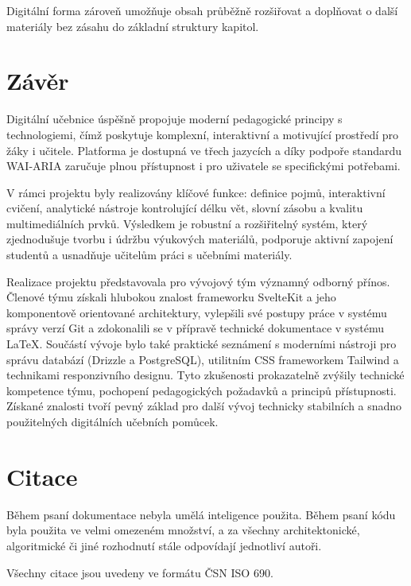 \documentclass[12pt]{article}
\begin{document}
    Digitální forma zároveň umožňuje obsah průběžně rozšiřovat a doplňovat o další materiály bez zásahu do základní struktury kapitol.

	\newpage
	\section{Závěr}
	
	Digitální učebnice úspěšně propojuje moderní pedagogické principy s technologiemi, čímž poskytuje komplexní, interaktivní a motivující prostředí pro žáky i učitele. Platforma je dostupná ve třech jazycích a díky podpoře standardu WAI-ARIA zaručuje plnou přístupnost i pro uživatele se specifickými potřebami.
	
	V rámci projektu byly realizovány klíčové funkce: definice pojmů, interaktivní cvičení, analytické nástroje kontrolující délku vět, slovní zásobu a kvalitu multimediálních prvků. Výsledkem je robustní a rozšiřitelný systém, který zjednodušuje tvorbu i údržbu výukových materiálů, podporuje aktivní zapojení studentů a usnadňuje učitelům práci s učebními materiály.
	
	Realizace projektu představovala pro vývojový tým významný odborný přínos. Členové týmu získali hlubokou znalost frameworku SvelteKit a jeho komponentově orientované architektury, vylepšili své postupy práce v systému správy verzí Git a zdokonalili se v přípravě technické dokumentace v systému \LaTeX. Součástí vývoje bylo také praktické seznámení s moderními nástroji pro správu databází (Drizzle a PostgreSQL), utilitním CSS frameworkem Tailwind a technikami responzivního designu. Tyto zkušenosti prokazatelně zvýšily technické kompetence týmu, pochopení pedagogických požadavků a principů přístupnosti. Získané znalosti tvoří pevný základ pro další vývoj technicky stabilních a snadno použitelných digitálních učebních pomůcek.
	
	\newpage
	\listoffigures



	\newpage
	\section*{Citace}
		Během psaní dokumentace nebyla umělá inteligence použita. Během psaní kódu byla použita ve velmi omezeném množství, a za všechny architektonické, algoritmické či jiné rozhodnutí stále odpovídají jednotliví autoři.

		\noindent
		Všechny citace jsou uvedeny ve formátu ČSN ISO 690.

		\nocite{Hrozinka}
		\nocite{HrozinkaDva}
		\nocite{MDN}
		\nocite{Nodemailer}
     	\nocite{Tailwind}
     	\nocite{Cloudinary}
     	\nocite{FuseJS}

		\printbibliography[heading=none]
\end{document}
